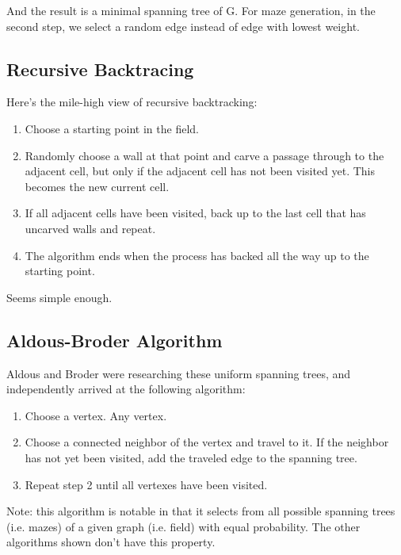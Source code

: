 \documentclass{article}
\begin{document}
And the result is a minimal spanning tree of G. For maze generation, in the second step, we select a random edge instead of edge with lowest weight.

\subsection{Recursive Backtracing}
Here's the mile-high view of recursive backtracking:
\begin{enumerate}
    \item Choose a starting point in the field.
    \item Randomly choose a wall at that point and carve a passage through to the adjacent cell, but only if the adjacent cell has not been visited yet. This becomes the new current cell.
    \item If all adjacent cells have been visited, back up to the last cell that has uncarved walls and repeat.
    \item The algorithm ends when the process has backed all the way up to the starting point.
\end{enumerate}

Seems simple enough.

\subsection{Aldous-Broder Algorithm}
Aldous and Broder were researching these uniform spanning trees, and independently arrived at the following algorithm:
\begin{enumerate}
    \item Choose a vertex. Any vertex.
    \item Choose a connected neighbor of the vertex and travel to it. If the neighbor has not yet been visited, add the traveled edge to the spanning tree.
    \item Repeat step 2 until all vertexes have been visited.
\end{enumerate}

Note: this algorithm is notable in that it selects from all possible spanning trees (i.e. mazes) of a given graph (i.e. field) with equal probability. The other algorithms shown don't have this property.
\end{document}
